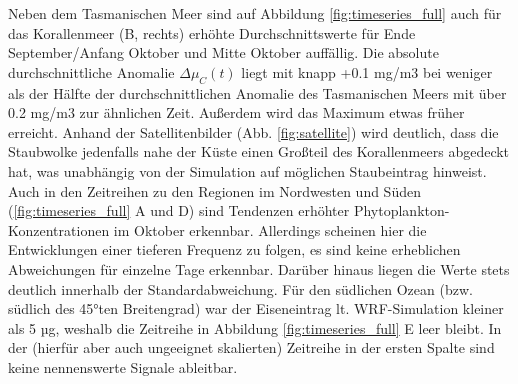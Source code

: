 \documentclass[12pt,a4paper,onecolumn,headheight=30pt]{scrartcl}
\begin{document}
Neben dem Tasmanischen Meer sind auf Abbildung \ref{fig:timeseries_full} auch für das Korallenmeer (B, rechts) erhöhte Durchschnittswerte für Ende September/Anfang Oktober und Mitte Oktober auffällig. Die absolute durchschnittliche Anomalie $\Delta \mu_C(t)$ liegt mit knapp +0.1 mg/m3 bei weniger als der Hälfte der durchschnittlichen Anomalie des Tasmanischen Meers mit über 0.2 mg/m3 zur ähnlichen Zeit. Außerdem wird das Maximum etwas früher erreicht. Anhand der Satellitenbilder (Abb. \ref{fig:satellite}) wird deutlich, dass die Staubwolke jedenfalls nahe der Küste einen Großteil des Korallenmeers abgedeckt hat, was unabhängig von der Simulation auf möglichen Staubeintrag hinweist. Auch in den Zeitreihen zu den Regionen im Nordwesten und Süden (\ref{fig:timeseries_full} A und D) sind Tendenzen erhöhter Phytoplankton-Konzentrationen im Oktober erkennbar. Allerdings scheinen hier die Entwicklungen einer tieferen Frequenz zu folgen, es sind keine erheblichen Abweichungen für einzelne Tage erkennbar. Darüber hinaus liegen die Werte stets deutlich innerhalb der Standardabweichung. Für den südlichen Ozean (bzw. südlich des 45°ten Breitengrad) war der Eiseneintrag lt. WRF-Simulation kleiner als 5 µg, weshalb die Zeitreihe in Abbildung \ref{fig:timeseries_full} E leer bleibt. In der (hierfür aber auch  ungeeignet skalierten) Zeitreihe in der ersten Spalte sind keine nennenswerte Signale ableitbar.
\end{document}
